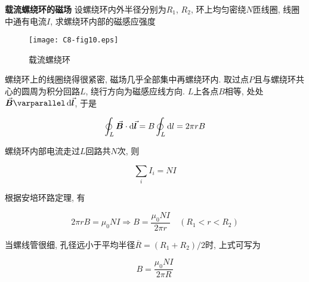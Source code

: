\begin{example}
	\textbf{载流螺绕环的磁场} \quad 设螺绕环内外半径分别为$R_1$, $R_2$, 环上均匀密绕$N$匝线圈, 线圈中通有电流$I$, 求螺绕环内部的磁感应强度
	
	\begin{figure}[H]
		\centering
		\texttt{[image: C8-fig10.eps]}
		\caption{载流螺绕环}
	\end{figure}
	
	\begin{solution}
		
		螺绕环上的线圈绕得很紧密, 磁场几乎全部集中再螺绕环内. 取过点$P$且与螺绕环共心的圆周为积分回路$L$, 绕行方向为磁感应线方向. $L$上各点$B$相等, 处处$\va*{B} \varparallel \dd{\va*{l}}$, 于是
		
		\begin{equation*}
			\oint_{L} \va*{B} \cdot \dd{\va*{l}} = B \oint_{L} \dd{l} = 2 \pi r B
		\end{equation*}

		螺绕环内部电流走过$L$回路共$N$次, 则
		
		\begin{equation*}
			\sum\limits_{i} I_i = N I
		\end{equation*}
		
		根据安培环路定理, 有
		
		\begin{equation*}
			2 \pi r B = \mu_0 N I \Rightarrow B = \dfrac{\mu_0 N I}{2 \pi r} \quad (R_1 < r < R_2)
		\end{equation*}
		
		当螺线管很细, 孔径远小于平均半径$\overline{R} = (R_1 + R_2) / 2$时, 上式可写为
		
		\begin{equation*}
			B = \dfrac{\mu_0 N I}{2 \pi R}
		\end{equation*}
		
	\end{solution}
	
\end{example}

